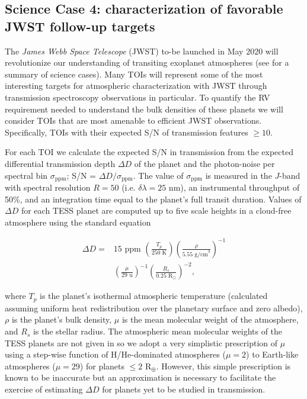 \subsection{Science Case 4: characterization of favorable JWST follow-up targets} \label{RVFCsect:jwst}
The \emph{James Webb Space Telescope} (JWST) to-be launched in May 2020 will revolutionize our
understanding of transiting exoplanet atmospheres (see \citealt{beichman14} for a summary of science cases).
Many TOIs will represent some of the most interesting targets for atmospheric characterization with
JWST through transmission spectroscopy observations in particular. To quantify the RV requirement needed
to understand the bulk densities of these planets we will consider TOIs that are most amenable to
efficient JWST observations. Specifically, TOIs with their expected S/N of transmission features
$\geq 10$.

For each TOI we calculate the expected S/N in transmission from the expected
differential transmission depth $\Delta D$ of the planet and the photon-noise per spectral bin
$\sigma_{\text{ppm}}$; S/N = $\Delta D / \sigma_{\text{ppm}}$. The value of $\sigma_{\text{ppm}}$
is measured in the $J$-band with spectral resolution $R=50$ (i.e. $\delta \lambda = 25$ nm), an
instrumental throughput of 50\%, and an integration time equal to the planet's full transit duration.
Values of $\Delta D$ for each TESS planet are computed up to five
scale heights in a cloud-free atmosphere using the standard equation

\begin{equation}
  \begin{split}
    \Delta D = & 15 \text{ ppm } \left( \frac{T_p}{250 \text{ K}} \right)
    \left( \frac{\rho}{5.55 \text{ g/cm}^3} \right)^{-1} \\
    &\left( \frac{\mu}{29 \text{ u}} \right)^{-1}
    \left( \frac{R_s}{0.25 \text{ R}_{\odot}} \right)^{-2},
  \end{split}
  \label{RVFCeq:transm}
\end{equation}

\noindent where $T_p$ is the planet's isothermal atmospheric temperature (calculated assuming uniform heat
redistribution over the planetary surface and zero albedo), $\rho$ is the planet's
bulk density, $\mu$ is the mean molecular weight of the atmosphere, and $R_s$ is the stellar
radius. The atmospheric mean molecular weights of the TESS planets are not given in 
so we adopt a very simplistic prescription of $\mu$ using a step-wise function of H/He-dominated atmospheres
($\mu=2$) to Earth-like atmospheres ($\mu=29$) for planets $\leq 2$ R$_{\oplus}$. However, this simple prescription
is known to be inaccurate but an approximation is necessary to facilitate the exercise of estimating $\Delta D$
for planets yet to be studied in transmission.

